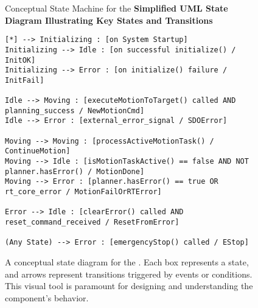 \begin{figure}[h!]
    \centering
    \begin{infobox}{Conceptual State Machine for the }
        \textbf{Simplified UML State Diagram Illustrating Key States and Transitions}

        \begin{verbatim}
[*] --> Initializing : [on System Startup]
Initializing --> Idle : [on successful initialize() / InitOK]
Initializing --> Error : [on initialize() failure / InitFail]

Idle --> Moving : [executeMotionToTarget() called AND planning_success / NewMotionCmd]
Idle --> Error : [external_error_signal / SDOError]

Moving --> Moving : [processActiveMotionTask() / ContinueMotion]
Moving --> Idle : [isMotionTaskActive() == false AND NOT planner.hasError() / MotionDone]
Moving --> Error : [planner.hasError() == true OR rt_core_error / MotionFailOrRTError]

Error --> Idle : [clearError() called AND reset_command_received / ResetFromError]

(Any State) --> Error : [emergencyStop() called / EStop]
        \end{verbatim}
    \end{infobox}
     \vspace{0.3cm}
    \caption{A conceptual state diagram for the . Each box represents a state, and arrows represent transitions triggered by events or conditions. This visual tool is paramount for designing and understanding the component's behavior.}
    \label{fig:controller_state_machine_conceptual_revised}
\end{figure}

